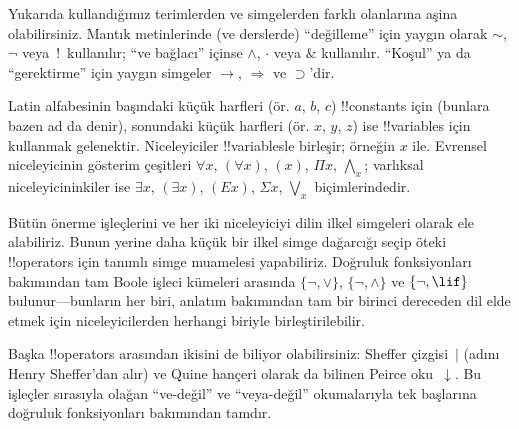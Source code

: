 
\begin{intro}
Yukarıda kullandığımız terimlerden ve simgelerden farklı olanlarına
aşina olabilirsiniz. Mantık metinlerinde (ve derslerde) ``değilleme''
için yaygın olarak $\sim$, $\neg$ veya~!\ kullanılır; ``ve bağlacı'' içinse
$\wedge$, $\cdot$ veya $\&$ kullanılır. ``Koşul'' ya da ``gerektirme''
için yaygın simgeler $\rightarrow$, $\Rightarrow$ ve $\supset$'dir.

Latin alfabesinin başındaki küçük harfleri (ör. $a$, $b$, $c$)
!!{constant}s için (bunlara bazen ad da denir), sonundaki küçük harfleri
(ör. $x$, $y$, $z$) ise !!{variable}s için kullanmak gelenektir.
Niceleyiciler !!{variable}s{}le birleşir; örneğin $x$ ile. Evrensel
niceleyicinin gösterim çeşitleri $\forall x$, $(\forall x)$, $(x)$, $\Pi x$,
$\bigwedge_x$; varlıksal niceleyicininkiler ise $\exists x$, $(\exists
x)$, $(Ex)$, $\Sigma x$, $\bigvee_x$ biçimlerindedir.
\end{intro}

\begin{explain}
Bütün önerme işleçlerini ve her iki niceleyiciyi dilin ilkel simgeleri
olarak ele alabiliriz. Bunun yerine daha küçük bir ilkel simge dağarcığı
seçip öteki !!{operator}s için tanımlı simge muamelesi yapabiliriz. Doğruluk
fonksiyonları bakımından tam Boole işleci kümeleri arasında
$\{ \lnot, \lor \}$, $\{ \lnot, \land \}$ ve $\{ \lnot,
\lif\}$ bulunur---bunların her biri, anlatım bakımından tam bir birinci
dereceden dil elde etmek için niceleyicilerden herhangi biriyle
birleştirilebilir.

Başka !!{operator}s arasından ikisini de biliyor olabilirsiniz: Sheffer çizgisi~$|$
(adını Henry Sheffer'dan alır) ve Quine hançeri olarak da bilinen
Peirce oku~$\downarrow$. Bu işleçler sırasıyla olağan ``ve-değil'' ve
``veya-değil'' okumalarıyla tek başlarına doğruluk fonksiyonları
bakımından tamdır.
\end{explain}

